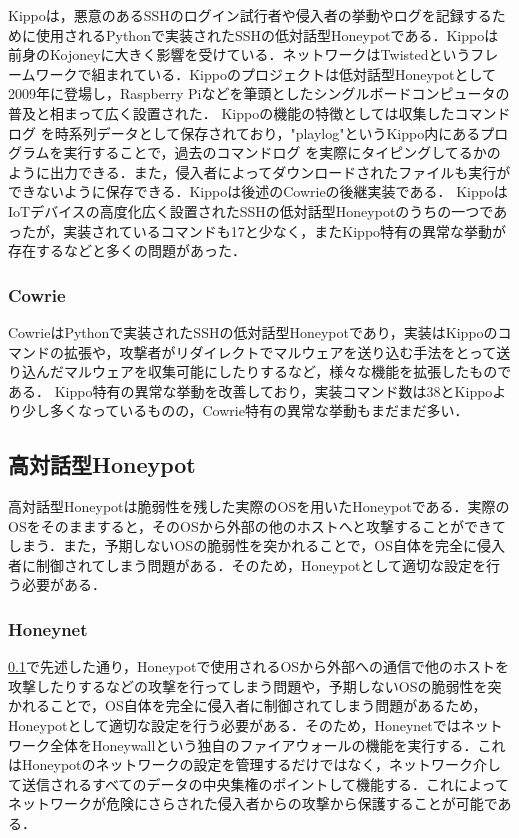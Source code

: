 Kippoは，悪意のあるSSHのログイン試行者や侵入者の挙動やログを記録するために使用されるPythonで実装されたSSHの低対話型Honeypotである\cite{kippo}．Kippoは前身のKojoney\cite{kojoney}に大きく影響を受けている．ネットワークはTwisted\cite{twisted}というフレームワークで組まれている．Kippoのプロジェクトは低対話型Honeypotとして2009年に登場し，Raspberry Pi\cite{rasp}などを筆頭としたシングルボードコンピュータ\cite{singleboard}の普及と相まって広く設置された．
Kippoの機能の特徴としては収集したコマンドログ を時系列データとして保存されており，"playlog"というKippo内にあるプログラムを実行することで，過去のコマンドログ を実際にタイピングしてるかのように出力できる．また，侵入者によってダウンロードされたファイルも実行ができないように保存できる．Kippoは後述のCowrieの後継実装である．\cite{kippowiki}
KippoはIoTデバイスの高度化広く設置されたSSHの低対話型Honeypotのうちの一つであったが，実装されているコマンドも17\cite{kippocommand}と少なく，またKippo特有の異常な挙動が存在するなどと多くの問題があった．

\subsubsection{Cowrie}
\label{tech:Cowrie}
CowrieはPythonで実装されたSSHの低対話型Honeypotであり，実装はKippoのコマンドの拡張や，攻撃者がリダイレクトでマルウェアを送り込む手法をとって送り込んだマルウェアを収集可能にしたりするなど，様々な機能を拡張したものである．
Kippo特有の異常な挙動を改善しており，実装コマンド数は38\cite{cowriecommand}とKippoより少し多くなっているものの\cite{differfromkippo}，Cowrie特有の異常な挙動もまだまだ多い．



\subsection{高対話型Honeypot}
\label{tech:HighInteractionHoneypot}
高対話型Honeypotは脆弱性を残した実際のOSを用いたHoneypotである．実際のOSをそのまますると，そのOSから外部の他のホストへと攻撃することができてしまう．また，予期しないOSの脆弱性を突かれることで，OS自体を完全に侵入者に制御されてしまう問題がある．そのため，Honeypotとして適切な設定を行う必要がある．

\subsubsection{Honeynet}
\label{tech:Honeynet}
\ref{tech:HighInteractionHoneypot}で先述した通り，Honeypotで使用されるOSから外部への通信で他のホストを攻撃したりするなどの攻撃を行ってしまう問題や，予期しないOSの脆弱性を突かれることで，OS自体を完全に侵入者に制御されてしまう問題があるため，Honeypotとして適切な設定を行う必要がある．そのため，Honeynetではネットワーク全体をHoneywallという独自のファイアウォールの機能を実行する．これはHoneypotのネットワークの設定を管理するだけではなく，ネットワーク介して送信されるすべてのデータの中央集権のポイントして機能する．これによってネットワークが危険にさらされた侵入者からの攻撃から保護することが可能である．\cite{honeywall}


